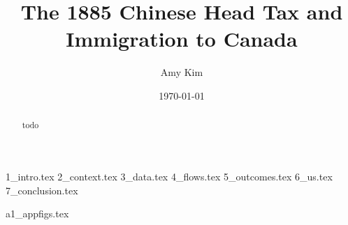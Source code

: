\documentclass[12pt]{article}
\title{The 1885 Chinese Head Tax and Immigration to Canada}
\author{Amy Kim}
\date{\today}
\begin{document}
\maketitle

\begin{abstract} \footnotesize
    todo
\end{abstract}

\newpage
{1_intro.tex}
{2_context.tex}
{3_data.tex}
{4_flows.tex}
{5_outcomes.tex}
{6_us.tex}
{7_conclusion.tex}

\newpage


\newpage
\appendix 
{a1_appfigs.tex}
\end{document}
